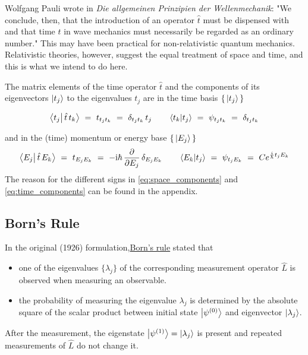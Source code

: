 \documentclass[12pt]{article}
\begin{document}
Wolfgang Pauli wrote in \emph{Die allgemeinen Prinzipien der Wellenmechanik}: "We conclude, then, that the introduction of an operator $\hat{t}$ must be dispensed with and that time $t$ in wave mechanics must necessarily be regarded as an ordinary number." This may have been practical for non-relativistic quantum mechanics. Relativistic theories, however, suggest the equal treatment of space and time, and this is what we intend to do here.

The matrix elements of the time operator $\hat{t}$ and the components of its eigenvectors $\ket{t_j}$ to the eigenvalues $t_j$ are in the time basis $\{\,\ket{t_j}\,\}$

\begin{equation}
\bra{t_j}\ket{\,\hat{t}\,t_k}\ =\ t_{t_j t_k}\ =\ \delta_{t_j t_k}\,t_j
\quad\quad 
\bra{t_k}\ket{t_j}\ =\ \psi_{t_j t_k}\ =\ \delta_{t_j t_k}
\end{equation}

and in the (time) momentum or energy base $\{\,\ket{E_j}\,\}$
\begin{equation}
\label{eq:time_components}
\bra{E_j}\ket{\,\hat{t}\,E_k}\ =\ t_{E_j E_k}\ =\ 
-\mathrm{i}\hbar\,\frac{\partial}{\partial E_j}\,\delta_{E_j E_k}
\quad\quad 
\bra{E_k}\ket{t_j}\ =\ \psi_{t_j E_k}\ =\ C e^{\frac{i}{\hbar}t_j E_k}
\end{equation}
The reason for the different signs in \eqref{eq:space_components} and \eqref{eq:time_components} can be found in the appendix.

\subsection{Born's Rule}

In the original (1926) formulation,\href{https://en.wikipedia.org/wiki/Born_rule}{Born's rule} stated that
\begin{itemize}
\item one of the eigenvalues $\{\lambda_j\}$ of the corresponding measurement operator $\hat{L}$ is observed when measuring an observable.
\item the probability of measuring the eigenvalue $\lambda_j$ is determined by the absolute square of the scalar product between initial state $\ket{\psi^{(0)}}$ and eigenvector $\ket{\lambda_j}$.
\end{itemize}
After the measurement, the eigenstate $\ket{\psi^{(1)}} = \ket{\lambda_j}$ is present and repeated measurements of $\hat{L}$ do not change it.
\end{document}
